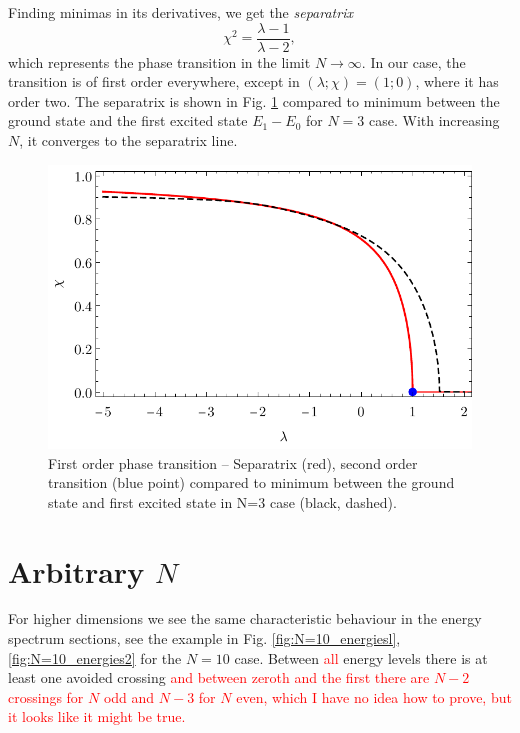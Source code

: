 Finding minimas in its derivatives, we get the \emph{separatrix}
\begin{equation}
    \chi^2=\frac{\lambda-1}{\lambda-2},
    \label{eq:separatrix}
\end{equation}
which represents the phase transition in the limit $N\rightarrow \infty$. In our case, the transition is of first order everywhere, except in $(\lambda;\chi)=(1;0)$, where it has order two. The separatrix is shown in Fig. \ref{fig:transitionCompare} compared to minimum between the ground state and the first excited state $E_1-E_0$ for $N=3$ case. With increasing $N$, it converges to the separatrix line.

\begin{figure}[H]
    \centering
    \includegraphics{../img/infiniteN_transitionCompare.pdf}
    \caption{First order phase transition -- Separatrix (red), second order transition (blue point) compared to minimum between the ground state and first excited state in N=3 case (black, dashed).}
    \label{fig:transitionCompare}    
\end{figure}




\section{Arbitrary $N$}
For higher dimensions we see the same characteristic behaviour in the energy spectrum sections, see the example in Fig. \ref{fig:N=10_energiesl}, \ref{fig:N=10_energies2} for the $N=10$ case. Between \textcolor{red}{all} energy levels there is at least one avoided crossing \textcolor{red}{and between zeroth and the first there are $N-2$ crossings for $N$ odd and $N-3$ for $N$ even, which I have no idea how to prove, but it looks like it might be true.}



